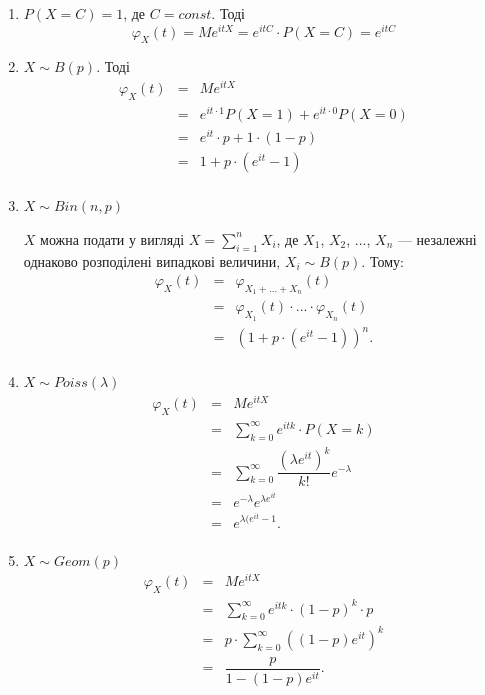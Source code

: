 \begin{example}
\begin{enumerate}
    \item $P(X = C) = 1$, де $C = const$. Тоді
        $$\varphi_{X}(t)
        = M e^{itX}
        = e^{itC} \cdot P(X = C)
        = e^{itC}$$
    \item $X \sim B(p)$. Тоді
        $$\begin{array}{rcl}
            \varphi_{X}(t) & = & Me^{itX} \\
            & = & e^{it \cdot 1} P(X = 1) + e^{it \cdot 0} P(X = 0) \\
            & = & e^{it} \cdot p + 1 \cdot (1 - p) \\
            & = & 1 + p \cdot (e^{it} - 1) \\
        \end{array}$$
    \item $X \sim Bin(n, p)$
        
        $X$ можна подати у вигляді $X = \sum\limits_{i=1}^n X_i$, де $X_1$,
        $X_2$, ..., $X_n$ --- незалежні однаково розподілені випадкові
        величини, $X_i \sim B(p)$. 
        Тому:
        $$\begin{array}{rcl}
            \varphi_X(t) & = & \varphi_{X_1 + ... + X_n}(t) \\
            & = & \varphi_{X_1}(t) \cdot ... \cdot \varphi_{X_n}(t) \\
            & = & (1 + p \cdot (e^{it} - 1))^{n}. \\
        \end{array}$$
    \item $X \sim Poiss(\lambda)$
        $$\begin{array}{rcl}
            \varphi_X(t) & = & Me^{itX} \\
            & = & \sum\limits_{k=0}^{\infty} e^{itk} \cdot P(X = k) \\
            & = & \sum\limits_{k=0}^{\infty} \dfrac{(\lambda e^{it})^k}{k!} e^{-\lambda} \\
            & = & e^{-\lambda} e^{\lambda e^{it}} \\
            & = & e^{\lambda(e^{it} - 1}. \\
        \end{array}$$

    \item $X \sim Geom(p)$
        $$\begin{array}{rcl}
            \varphi_X(t) & = & Me^{itX} \\
            & = & \sum\limits_{k=0}^{\infty} e^{itk} \cdot (1-p)^k \cdot p \\
            & = & p \cdot \sum\limits_{k=0}^{\infty} ((1-p)e^{it})^k \\
            & = & \dfrac{p}{1 - (1-p)e^{it}}. \\
        \end{array}$$


\end{enumerate}
\end{example}

